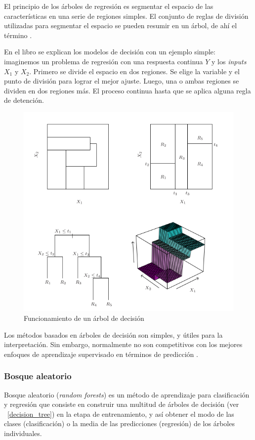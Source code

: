 \documentclass[12pt,a4paper]{article}
\begin{document}
El principio de los árboles de regresión es segmentar el espacio de las características en una serie de regiones simples. El conjunto de reglas de división utilizadas para segmentar el espacio se pueden resumir en un árbol, de ahí el término \cite{gareth2013introduction}.


En el libro  \cite{hastie2009elements} se explican los modelos de decisión con un ejemplo simple: imaginemos un problema de regresión con una respuesta continua $Y$ y los \textit{inputs} $X_1$ y $X_2$. Primero se divide el espacio en dos regiones. Se elige la variable y el punto de división para lograr el mejor ajuste. Luego, una o ambas regiones se dividen en dos regiones más. El proceso continua hasta que se aplica alguna regla de detención.



\begin{figure}[H]
	\centering
	\includegraphics[width=0.7\linewidth]{figs/decission_tree}
	\caption{Funcionamiento de un árbol de decisión \cite{gareth2013introduction}}
	\label{fig:decissiontree}
\end{figure}


Los métodos basados en árboles de decisión son simples, y útiles para la interpretación. Sin embargo, normalmente no son competitivos con los mejores enfoques de aprendizaje supervisado en términos de predicción \cite{gareth2013introduction}.

\subsubsection{Bosque aleatorio}
Bosque aleatorio (\textit{random forests}) es un método de aprendizaje para clasificación y regresión que consiste en construir una multitud de árboles de decisión (ver ~\ref{decision_tree}) en la etapa de entrenamiento, y así obtener el modo de las clases (clasificación) o la media de las predicciones (regresión) de los árboles individuales.
\end{document}

